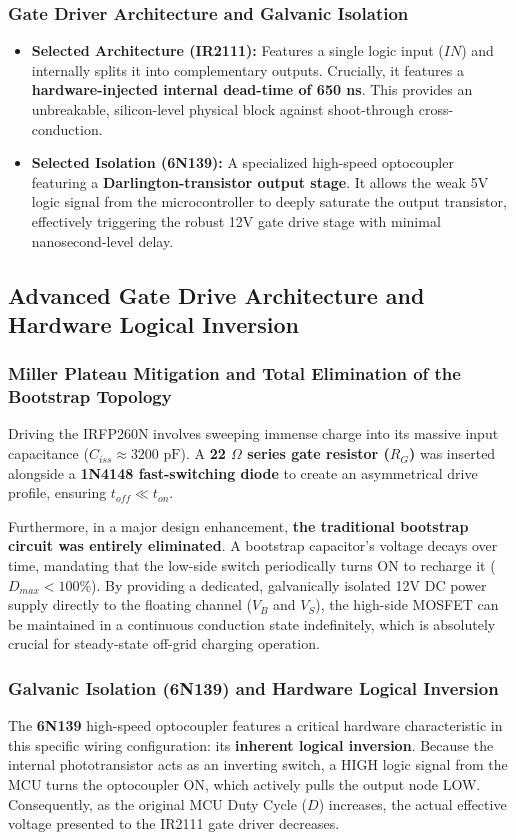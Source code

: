 \subsubsection{Gate Driver Architecture and Galvanic Isolation}
\begin{itemize}
    \item \textbf{Selected Architecture (IR2111):} Features a single logic input ($IN$) and internally splits it into complementary outputs. Crucially, it features a \textbf{hardware-injected internal dead-time of 650 ns}. This provides an unbreakable, silicon-level physical block against shoot-through cross-conduction.
    \item \textbf{Selected Isolation (6N139):} A specialized high-speed optocoupler featuring a \textbf{Darlington-transistor output stage}. It allows the weak 5V logic signal from the microcontroller to deeply saturate the output transistor, effectively triggering the robust 12V gate drive stage with minimal nanosecond-level delay.
\end{itemize}

\subsection{Advanced Gate Drive Architecture and Hardware Logical Inversion}

\subsubsection{Miller Plateau Mitigation and Total Elimination of the Bootstrap Topology}
Driving the IRFP260N involves sweeping immense charge into its massive input capacitance ($C_{iss} \approx 3200\text{ pF}$). A \textbf{22 $\Omega$ series gate resistor ($R_G$)} was inserted alongside a \textbf{1N4148 fast-switching diode} to create an asymmetrical drive profile, ensuring $t_{off} \ll t_{on}$.

Furthermore, in a major design enhancement, \textbf{the traditional bootstrap circuit was entirely eliminated}. A bootstrap capacitor's voltage decays over time, mandating that the low-side switch periodically turns ON to recharge it ($D_{max} < 100\%$). By providing a dedicated, galvanically isolated 12V DC power supply directly to the floating channel ($V_B$ and $V_S$), the high-side MOSFET can be maintained in a continuous conduction state indefinitely, which is absolutely crucial for steady-state off-grid charging operation.

\subsubsection{Galvanic Isolation (6N139) and Hardware Logical Inversion}
The \textbf{6N139} high-speed optocoupler features a critical hardware characteristic in this specific wiring configuration: its \textbf{inherent logical inversion}. Because the internal phototransistor acts as an inverting switch, a HIGH logic signal from the MCU turns the optocoupler ON, which actively pulls the output node LOW. Consequently, as the original MCU Duty Cycle ($D$) increases, the actual effective voltage presented to the IR2111 gate driver decreases. 

